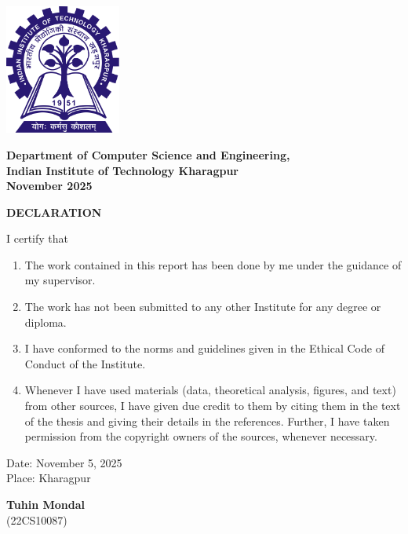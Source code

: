 \documentclass[11pt,english,a4paper]{article}
\begin{document}
\begin{titlepage}
\begin{center}
    \vspace{0.2in}
    \begin{center}
        \includegraphics[width=1.5in]{Figures/logo.png}
    \end{center}
    \vspace{0.2in}
    {\Large\textbf{Department of Computer Science and Engineering,}}\medskip\\
    {\Large\textbf{Indian Institute of Technology Kharagpur}}\medskip\\
    {\large\textbf{November 2025}}
\end{center}
\end{titlepage}

\newpage
\begin{center}
    {\Large\textbf{DECLARATION}}\\[0.4in]
\end{center}

I certify that

\begin{enumerate}
    \item The work contained in this report has been done by me under the guidance of my supervisor.
    \item The work has not been submitted to any other Institute for any degree or diploma.
    \item I have conformed to the norms and guidelines given in the Ethical Code of Conduct of the Institute.
    \item Whenever I have used materials (data, theoretical analysis, figures, and text) from other sources, I have given due credit to them by citing them in the text of the thesis and giving their details in the references. Further, I have taken permission from the copyright owners of the sources, whenever necessary.
\end{enumerate}
\vspace{3in}
\noindent
\begin{minipage}[t]{0.48\textwidth}
Date: November 5, 2025 \\
Place: Kharagpur
\end{minipage}\hfill
\begin{minipage}[t]{0.48\textwidth}
\begin{flushright}
\textbf{Tuhin Mondal}\\
(22CS10087)
\end{flushright}
\end{minipage}
\end{document}
